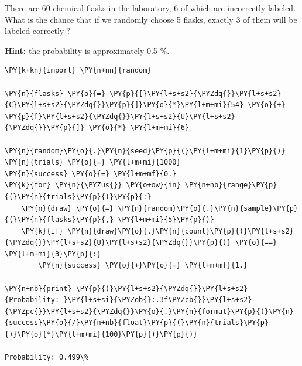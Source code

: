 \begin{Exercise}[title={(Monte Carlo Simulation}]
There are 60 chemical flasks in the laboratory, 6 of which are incorrectly labeled. What is the chance that if we randomly choose 5 flasks, exactly 3 of them will be labeled correctly ?

\textbf{Hint:} the probability is approximately 0.5 \%.
\end{Exercise}

\begin{Answer}
\begin{tcolorbox}[size=fbox, boxrule=1pt, colback=cellbackground, colframe=cellborder]
\begin{Verbatim}[commandchars=\\\{\}]
\PY{k+kn}{import} \PY{n+nn}{random}

\PY{n}{flasks} \PY{o}{=} \PY{p}{[}\PY{l+s+s2}{\PYZdq{}}\PY{l+s+s2}{C}\PY{l+s+s2}{\PYZdq{}}\PY{p}{]}\PY{o}{*}\PY{l+m+mi}{54} \PY{o}{+} \PY{p}{[}\PY{l+s+s2}{\PYZdq{}}\PY{l+s+s2}{U}\PY{l+s+s2}{\PYZdq{}}\PY{p}{]} \PY{o}{*} \PY{l+m+mi}{6}

\PY{n}{random}\PY{o}{.}\PY{n}{seed}\PY{p}{(}\PY{l+m+mi}{1}\PY{p}{)}
\PY{n}{trials} \PY{o}{=} \PY{l+m+mi}{1000}
\PY{n}{success} \PY{o}{=} \PY{l+m+mf}{0.}
\PY{k}{for} \PY{n}{\PYZus{}} \PY{o+ow}{in} \PY{n+nb}{range}\PY{p}{(}\PY{n}{trials}\PY{p}{)}\PY{p}{:}
    \PY{n}{draw} \PY{o}{=} \PY{n}{random}\PY{o}{.}\PY{n}{sample}\PY{p}{(}\PY{n}{flasks}\PY{p}{,} \PY{l+m+mi}{5}\PY{p}{)}
    \PY{k}{if} \PY{n}{draw}\PY{o}{.}\PY{n}{count}\PY{p}{(}\PY{l+s+s2}{\PYZdq{}}\PY{l+s+s2}{U}\PY{l+s+s2}{\PYZdq{}}\PY{p}{)} \PY{o}{==} \PY{l+m+mi}{3}\PY{p}{:}
        \PY{n}{success} \PY{o}{+}\PY{o}{=} \PY{l+m+mf}{1.}
        
\PY{n+nb}{print} \PY{p}{(}\PY{l+s+s2}{\PYZdq{}}\PY{l+s+s2}{Probability: }\PY{l+s+si}{\PYZob{}:.3f\PYZcb{}}\PY{l+s+s2}{\PYZpc{}}\PY{l+s+s2}{\PYZdq{}}\PY{o}{.}\PY{n}{format}\PY{p}{(}\PY{n}{success}\PY{o}{/}\PY{n+nb}{float}\PY{p}{(}\PY{n}{trials}\PY{p}{)}\PY{o}{*}\PY{l+m+mi}{100}\PY{p}{)}\PY{p}{)}

Probability: 0.499\%
\end{Verbatim}
\end{tcolorbox}
\end{Answer}

